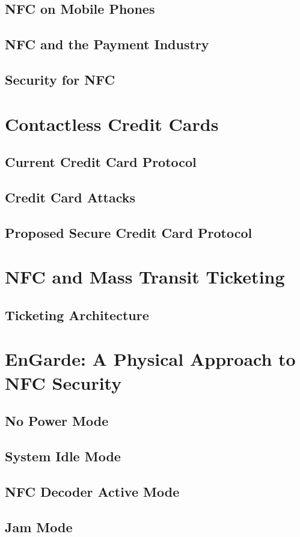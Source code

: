 \documentclass[unknownkeysallowed]{beamer}
\begin{document}
\subsection{NFC on Mobile Phones}
\subsection{NFC and the Payment Industry}
\subsection{Security for NFC}
\section{Contactless Credit Cards}
\subsection{Current Credit Card Protocol}
\subsection{Credit Card Attacks}
\subsection{Proposed Secure Credit Card Protocol}
\section{NFC and Mass Transit Ticketing}
\subsection{Ticketing Architecture}
\section{EnGarde: A Physical Approach to NFC Security}
\subsection{No Power Mode}
\subsection{System Idle Mode}
\subsection{NFC Decoder Active Mode}
\subsection{Jam Mode}
\end{document}
